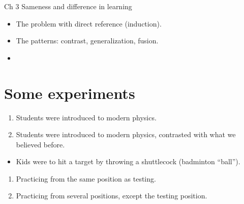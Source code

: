 \begin{frame}
  \begin{block}{Ch 3 Sameness and difference in learning}
    \begin{itemize}
      \item The problem with direct reference (induction).
      \item The patterns: contrast, generalization, fusion.
      \item {}
    \end{itemize}
  \end{block}
\end{frame}

\section{Some experiments}

\begin{frame}
  \begin{example}[Physics]
    \begin{enumerate}
      \item Students were introduced to modern physics.
      \item Students were introduced to modern physics, contrasted with what we 
        believed before.
    \end{enumerate}
  \end{example}
\end{frame}

\begin{frame}
  \begin{example}
    \begin{itemize}
      \item Kids were to hit a target by throwing a shuttlecock (badminton 
        \enquote{ball}).
    \end{itemize}
    \begin{enumerate}
      \item Practicing from the same position as testing.
      \item Practicing from several positions, except the testing position.
    \end{enumerate}
  \end{example}
\end{frame}

